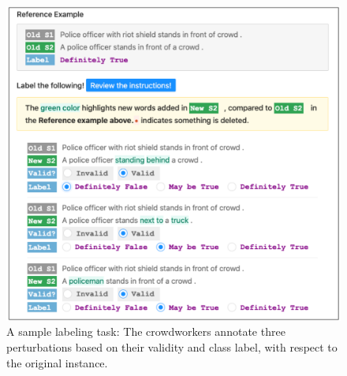 \begin{figure}[h]
\centering
\includegraphics[width=0.9\columnwidth]{figures/mturk_label}
\vspace{-5pt}
\caption{A sample labeling task: The crowdworkers annotate three perturbations based on their validity and class label, with respect to the original instance.}
\vspace{-15pt}
\label{fig:mturk_ui}
\end{figure}




